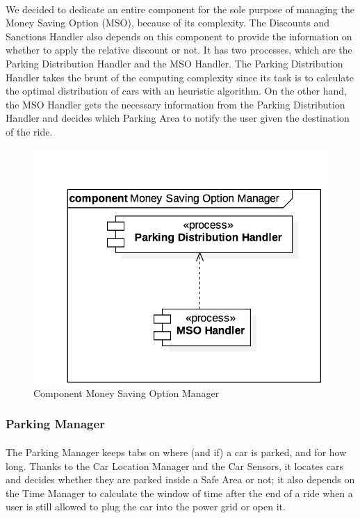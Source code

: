 		
		\paragraph{} We decided to dedicate an entire component for the sole purpose of managing the Money Saving Option (MSO), because of its complexity. The Discounts and Sanctions Handler also depends on this component to provide the information on whether to apply the relative discount or not. It has two processes, which are the Parking Distribution Handler and the MSO Handler. The Parking Distribution Handler takes the brunt of the computing complexity since its task is to calculate the optimal distribution of cars with an heuristic algorithm. On the other hand, the MSO Handler gets the necessary information from the Parking Distribution Handler and decides which Parking Area to notify the user given the destination of the ride.
		\begin{figure}[h]
				\includegraphics[scale=0.4, center]{img/component_diagrams/09_money_saving_option_manager.png}
				\caption{Component Money Saving Option Manager}
			\end{figure}
\FloatBarrier		
		
		\subsubsection*{Parking Manager}
		
		
		\paragraph{} The Parking Manager keeps tabs on where (and if) a car is parked, and for how long. Thanks to the Car Location Manager and the Car Sensors, it locates cars and decides whether they are parked inside a Safe Area or not; it also depends on the Time Manager to calculate the window of time after the end of a ride when a user is still allowed to plug the car into the power grid or open it.
\FloatBarrier

